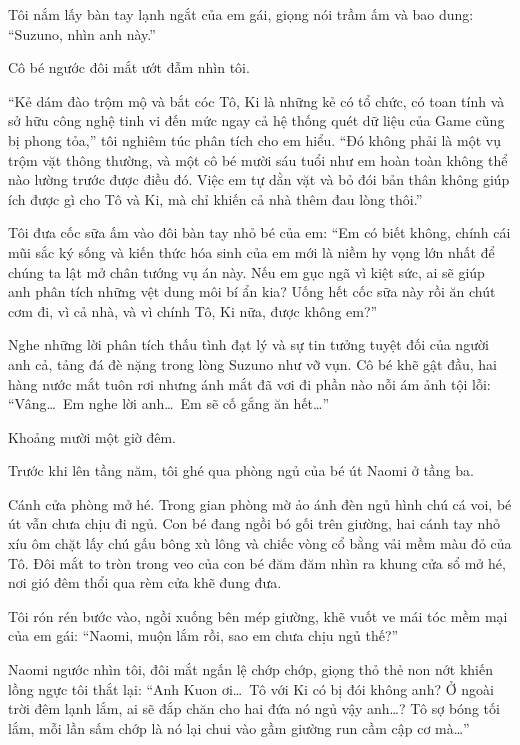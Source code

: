 \documentclass[../main.tex]{subfiles}
\begin{document}
Tôi nắm lấy bàn tay lạnh ngắt của em gái, giọng nói trầm ấm và bao dung: ``Suzuno, nhìn anh này.''

Cô bé ngước đôi mắt ướt đẫm nhìn tôi.

``Kẻ dám đào trộm mộ và bắt cóc Tô, Ki là những kẻ có tổ chức, có toan tính và sở hữu công nghệ tinh vi đến mức ngay cả hệ thống quét dữ liệu của Game cũng bị phong tỏa,'' tôi nghiêm túc phân tích cho em hiểu. ``Đó không phải là một vụ trộm vặt thông thường, và một cô bé mười sáu tuổi như em hoàn toàn không thể nào lường trước được điều đó. Việc em tự dằn vặt và bỏ đói bản thân không giúp ích được gì cho Tô và Ki, mà chỉ khiến cả nhà thêm đau lòng thôi.''

Tôi đưa cốc sữa ấm vào đôi bàn tay nhỏ bé của em: ``Em có biết không, chính cái mũi sắc ký sống và kiến thức hóa sinh của em mới là niềm hy vọng lớn nhất để chúng ta lật mở chân tướng vụ án này. Nếu em gục ngã vì kiệt sức, ai sẽ giúp anh phân tích những vệt dung môi bí ẩn kia? Uống hết cốc sữa này rồi ăn chút cơm đi, vì cả nhà, và vì chính Tô, Ki nữa, được không em?''

Nghe những lời phân tích thấu tình đạt lý và sự tin tưởng tuyệt đối của người anh cả, tảng đá đè nặng trong lòng Suzuno như vỡ vụn. Cô bé khẽ gật đầu, hai hàng nước mắt tuôn rơi nhưng ánh mắt đã vơi đi phần nào nỗi ám ảnh tội lỗi: ``Vâng\dots\ Em nghe lời anh\dots\ Em sẽ cố gắng ăn hết\dots''

\ct

Khoảng mười một giờ đêm.

Trước khi lên tầng năm, tôi ghé qua phòng ngủ của bé út Naomi ở tầng ba.

Cánh cửa phòng mở hé. Trong gian phòng mờ ảo ánh đèn ngủ hình chú cá voi, bé út vẫn chưa chịu đi ngủ. Con bé đang ngồi bó gối trên giường, hai cánh tay nhỏ xíu ôm chặt lấy chú gấu bông xù lông và chiếc vòng cổ bằng vải mềm màu đỏ của Tô. Đôi mắt to tròn trong veo của con bé đăm đăm nhìn ra khung cửa sổ mở hé, nơi gió đêm thổi qua rèm cửa khẽ đung đưa.

Tôi rón rén bước vào, ngồi xuống bên mép giường, khẽ vuốt ve mái tóc mềm mại của em gái: ``Naomi, muộn lắm rồi, sao em chưa chịu ngủ thế?''

Naomi ngước nhìn tôi, đôi mắt ngấn lệ chớp chớp, giọng thỏ thẻ non nớt khiến lồng ngực tôi thắt lại: ``Anh Kuon ơi\dots\ Tô với Ki có bị đói không anh? Ở ngoài trời đêm lạnh lắm, ai sẽ đắp chăn cho hai đứa nó ngủ vậy anh\dots? Tô sợ bóng tối lắm, mỗi lần sấm chớp là nó lại chui vào gầm giường run cầm cập cơ mà\dots''
\end{document}

